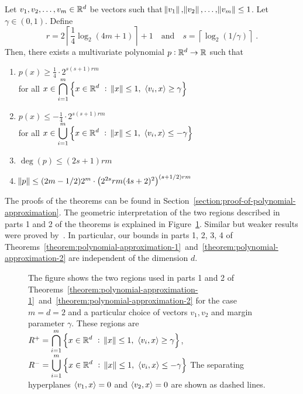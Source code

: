 \begin{theorem}
\label{theorem:polynomial-approximation-2}
Let $v_1, v_2, \dots, v_m \in \mathbb{R}^d$ be vectors such that $\norm{v_1},
\norm{v_2}, \dots, \norm{v_m} \le 1$. Let $\gamma \in (0,1)$.
Define
$$
r = 2 \left\lceil \frac{1}{4} \log_2(4m + 1) \right\rceil + 1 \quad \text{and} \quad s = \left \lceil \log_2(1/\gamma) \right \rceil \; .
$$
Then, there exists a multivariate polynomial $p:\mathbb{R}^d \to \mathbb{R}$ such that
\begin{enumerate}
\item $\displaystyle p(x) \ge \frac{1}{4} \cdot 2^{s(s+1)rm}$ \\
for all $\displaystyle x \in \bigcap_{i=1}^m \left\{ x \in \mathbb{R}^d ~:~ \norm{x} \le 1, \ \left\langle v_i, x \right\rangle \ge \gamma \right\}$

\item $\displaystyle p(x) \le - \frac{1}{4} \cdot 2^{s(s+1)rm}$ \\
for all $\displaystyle x \in \bigcup_{i=1}^m \left\{ x \in \mathbb{R}^d ~:~ \norm{x} \le 1, \ \left\langle v_i, x \right\rangle \le - \gamma \right\}$

\item $\deg(p) \le (2s+1) rm$
\item $\norm{p} \le (2m-1/2) 2^m \cdot \left(2^{2s} rm (4s+2)^2 \right)^{(s+1/2)rm}$
\end{enumerate}
\end{theorem}

The proofs of the theorems can be found in
Section~\ref{section:proof-of-polynomial-approximation}. The geometric
interpretation of the two regions described in parts 1 and 2 of the theorems is
explained in Figure~\ref{figure:pizza-slice}. Similar but weaker results were
proved by~\citet{Klivans-Servedio-2008}. In particular, our bounds in parts 1,
2, 3, 4 of
Theorems~\ref{theorem:polynomial-approximation-1}~and~\ref{theorem:polynomial-approximation-2}
are independent of the dimension $d$.

\begin{figure}
\begin{center}

\end{center}
\caption[]{The figure shows the two regions used in parts 1 and 2 of
Theorems~\ref{theorem:polynomial-approximation-1}~and~\ref{theorem:polynomial-approximation-2}
for the case $m=d=2$ and a particular choice of vectors $v_1, v_2$ and margin
parameter $\gamma$. These regions are
$R^+ = \displaystyle \bigcap_{i=1}^m \left\{ x \in \mathbb{R}^d ~:~ \norm{x} \le 1, \ \left\langle v_i, x \right\rangle \ge \gamma \right\}$,
$R^- = \displaystyle \bigcup_{i=1}^m \left\{ x \in \mathbb{R}^d ~:~ \norm{x} \le 1, \ \left\langle v_i, x \right\rangle \le - \gamma \right\}$
The separating hyperplanes $\left\langle v_1, x \right\rangle = 0$ and $\left\langle v_2, x \right\rangle = 0$ are shown as dashed lines.}
\label{figure:pizza-slice}
\end{figure}



